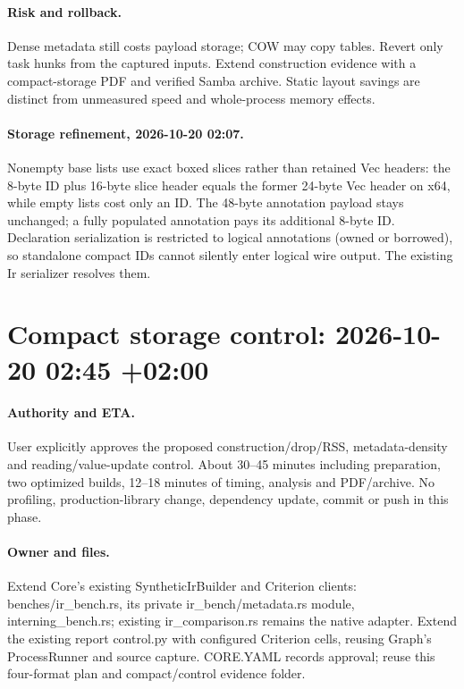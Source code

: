 \documentclass[11pt,a4paper]{article}
\begin{document}
\paragraph{Risk and rollback.} Dense metadata still costs payload storage; COW may
copy tables. Revert only task hunks from the captured inputs. Extend construction
evidence with a compact-storage PDF and verified Samba archive. Static layout
savings are distinct from unmeasured speed and whole-process memory effects.


\paragraph{Storage refinement, 2026-10-20 02:07.} Nonempty base lists use exact
boxed slices rather than retained Vec headers: the 8-byte ID plus 16-byte slice
header equals the former 24-byte Vec header on x64, while empty lists cost only
an ID. The 48-byte annotation payload stays unchanged; a fully populated
annotation pays its additional 8-byte ID. Declaration serialization is restricted
to logical annotations (owned or borrowed), so standalone compact IDs cannot
silently enter logical wire output. The existing Ir serializer resolves them.


\clearpage\section*{Compact storage control: 2026-10-20 02:45 +02:00}
\paragraph{Authority and ETA.} User explicitly approves the proposed construction/drop/RSS,
metadata-density and reading/value-update control. About 30--45 minutes including
preparation, two optimized builds, 12--18 minutes of timing, analysis and PDF/archive.
No profiling, production-library change, dependency update, commit or push in this phase.
\paragraph{Owner and files.} Extend Core's existing SyntheticIrBuilder and Criterion clients:
benches/ir\_bench.rs, its private ir\_bench/metadata.rs module, interning\_bench.rs;
existing ir\_comparison.rs remains the native adapter. Extend the existing report control.py
with configured Criterion cells, reusing Graph's ProcessRunner and source capture.
CORE.YAML records approval; reuse this four-format plan and compact/control evidence folder.
\end{document}
